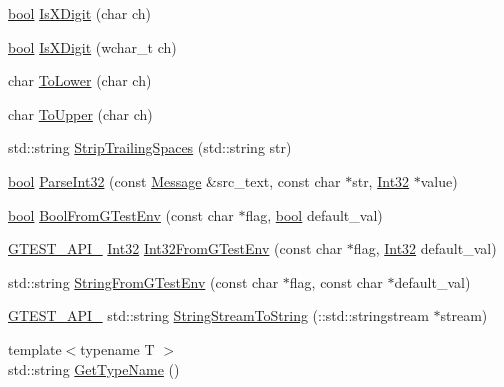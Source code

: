 \begin{DoxyCompactItemize}
\item 
\hyperlink{classbool}{bool} \hyperlink{namespacetesting_1_1internal_aa234ef141278263fb143b616c74c86e7}{Is\+X\+Digit} (char ch)
\item 
\hyperlink{classbool}{bool} \hyperlink{namespacetesting_1_1internal_a6ab68a30f8291c09b2289c132bbe3b16}{Is\+X\+Digit} (wchar\+\_\+t ch)
\item 
char \hyperlink{namespacetesting_1_1internal_ad9c627ef2a94245e3fd69e7ab3d49b42}{To\+Lower} (char ch)
\item 
char \hyperlink{namespacetesting_1_1internal_ac1b876a8133895bd553d4780ecaa1e3a}{To\+Upper} (char ch)
\item 
std\+::string \hyperlink{namespacetesting_1_1internal_aa6afda12e567c353e2e9b9c2e8cae14f}{Strip\+Trailing\+Spaces} (std\+::string str)
\item 
\hyperlink{classbool}{bool} \hyperlink{namespacetesting_1_1internal_ac06fc81336a3d80755f4020d34321766}{Parse\+Int32} (const \hyperlink{classtesting_1_1Message}{Message} \&src\+\_\+text, const char $\ast$str, \hyperlink{namespacetesting_1_1internal_a8ee38faaf875f133358abaf9bc056cec}{Int32} $\ast$value)
\item 
\hyperlink{classbool}{bool} \hyperlink{namespacetesting_1_1internal_a67132cdce23fb71b6c38ee34ef81eb4c}{Bool\+From\+G\+Test\+Env} (const char $\ast$flag, \hyperlink{classbool}{bool} default\+\_\+val)
\item 
\hyperlink{gtest-port_8h_aa73be6f0ba4a7456180a94904ce17790}{G\+T\+E\+S\+T\+\_\+\+A\+P\+I\+\_\+} \hyperlink{namespacetesting_1_1internal_a8ee38faaf875f133358abaf9bc056cec}{Int32} \hyperlink{namespacetesting_1_1internal_a0f7e728793f9e6cb0aa2b69eaa468bf3}{Int32\+From\+G\+Test\+Env} (const char $\ast$flag, \hyperlink{namespacetesting_1_1internal_a8ee38faaf875f133358abaf9bc056cec}{Int32} default\+\_\+val)
\item 
std\+::string \hyperlink{namespacetesting_1_1internal_ac54dabc540bf79c2de91add679bfb93b}{String\+From\+G\+Test\+Env} (const char $\ast$flag, const char $\ast$default\+\_\+val)
\item 
\hyperlink{gtest-port_8h_aa73be6f0ba4a7456180a94904ce17790}{G\+T\+E\+S\+T\+\_\+\+A\+P\+I\+\_\+} std\+::string \hyperlink{namespacetesting_1_1internal_ac0a2b7f69fc829d80a39e925b6417e39}{String\+Stream\+To\+String} (\+::std\+::stringstream $\ast$stream)
\item 
{\footnotesize template$<$typename T $>$ }\\std\+::string \hyperlink{namespacetesting_1_1internal_a635606b4731f843c86ec8ca51cab83a1}{Get\+Type\+Name} ()

\end{DoxyCompactItemize}
